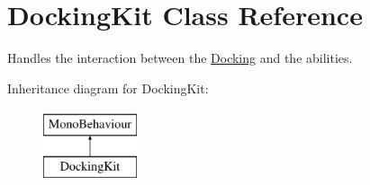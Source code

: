 \hypertarget{class_docking_kit}{}\section{Docking\+Kit Class Reference}
\label{class_docking_kit}


Handles the interaction between the \hyperlink{class_docking}{Docking} and the abilities.  


Inheritance diagram for Docking\+Kit\+:\begin{figure}[H]
\begin{center}
\leavevmode
\includegraphics[height=2.000000cm]{class_docking_kit}
\end{center}
\end{figure}
